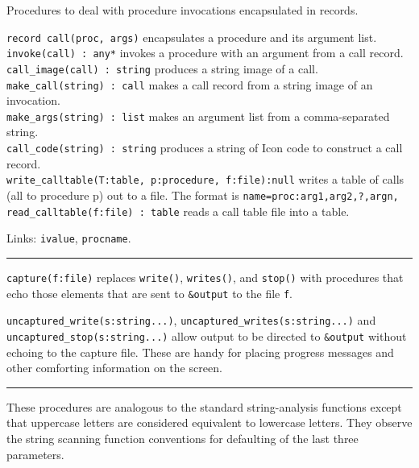 Procedures to deal with procedure
invocations encapsulated in records.

\texttt{record call(proc, args)} encapsulates a procedure
and its argument list.\\
\texttt{invoke(call) : any*} invokes a procedure with an argument from a
call record.\\
\texttt{call\_image(call) : string} produces a string image of a
call.\\
\texttt{make\_call(string) : call} makes a call record from a string
image of an invocation.\\
\texttt{make\_args(string) : list} makes an argument list from a
comma-separated string.\\
\texttt{call\_code(string) : string} produces a string of Icon code to
construct a call record.\\
\texttt{write\_calltable(T:table, p:procedure, f:file):null} writes a
table of calls (all to procedure p) out to a file. The format is
\texttt{name=proc:arg1,arg2,?,argn,}\\
\texttt{read\_calltable(f:file) : table} reads a call table file into a
table.

Links: \texttt{ivalue}, \texttt{procname}. 

\vspace{0.25cm}\hrule{}

\texttt{capture(f:file)} replaces \texttt{write()}, \texttt{writes()},
and \texttt{stop()} with procedures that echo those elements that are
sent to \texttt{\&output} to the file \texttt{f}.

\texttt{uncaptured\_write(s:string...)},
\texttt{uncaptured\_writes(s:string...)} and \linebreak
\texttt{uncaptured\_stop(s:string...)} allow output to be directed to
\texttt{\&output} without echoing to the capture file. These are handy
for placing progress messages and other comforting information on the
screen.

\vspace{0.25cm}\hrule{}

These procedures are analogous to the standard string-analysis functions
except that uppercase letters are considered equivalent to lowercase
letters. They observe the string scanning function conventions for
defaulting of the last three parameters.

